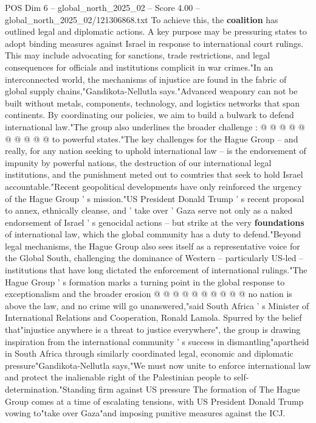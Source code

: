 \begin{textsample}{POS Dim 6 – global\_north\_2025\_02 – Score 4.00 – global\_north\_2025\_02/121306868.txt}
To achieve this, the \textbf{coalition} has outlined legal and diplomatic actions.
A key purpose may be pressuring states to adopt binding measures against Israel in response to international court rulings.
This may include advocating for sanctions, trade restrictions, and legal consequences for officials and institutions complicit in war crimes."In an interconnected world, the mechanisms of injustice are found in the fabric of global supply chains,"Gandikota-Nellutla says."Advanced weaponry can not be built without metals, components, technology, and logistics networks that span continents.
By coordinating our policies, we aim to build a bulwark to defend international law."The group also underlines the broader challenge : @ @ @ @ @ @ @ @ @ @ to powerful states."The key challenges for the Hague Group -- and really, for any nation seeking to uphold international law -- is the endorsement of impunity by powerful nations, the destruction of our international legal institutions, and the punishment meted out to countries that seek to hold Israel accountable."Recent geopolitical developments have only reinforced the urgency of the Hague Group ' s mission."US President Donald Trump ' s recent proposal to annex, ethnically cleanse, and ' take over ' Gaza serve not only as a naked endorsement of Israel ' s genocidal actions -- but strike at the very \textbf{foundations} of international law, which the global community has a duty to defend."Beyond legal mechanisms, the Hague Group also sees itself as a representative voice for the Global South, challenging the dominance of Western -- particularly US-led -- institutions that have long dictated the enforcement of international rulings."The Hague Group ' s formation marks a turning point in the global response to exceptionalism and the broader erosion @ @ @ @ @ @ @ @ @ @ no nation is above the law, and no crime will go unanswered,"said South Africa ' s Minister of International Relations and Cooperation, Ronald Lamola.
Spurred by the belief that"injustice anywhere is a threat to justice everywhere", the group is drawing inspiration from the international community ' s success in dismantling"apartheid in South Africa through similarly coordinated legal, economic and diplomatic pressure"Gandikota-Nellutla says,"We must now unite to enforce international law and protect the inalienable right of the Palestinian people to self-determination."Standing firm against US pressure The formation of The Hague Group comes at a time of escalating tensions, with US President Donald Trump vowing to"take over Gaza"and imposing punitive measures against the ICJ.

\end{textsample}

